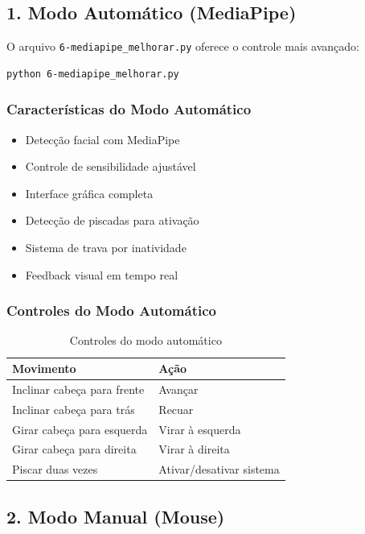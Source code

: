 \documentclass[12pt,a4paper]{article}
\begin{document}
\subsection{1. Modo Automático (MediaPipe)}

O arquivo \texttt{6-mediapipe\_melhorar.py} oferece o controle mais avançado:

\begin{lstlisting}[language=bash]
python 6-mediapipe_melhorar.py
\end{lstlisting}

\subsubsection{Características do Modo Automático}

\begin{itemize}
    \item Detecção facial com MediaPipe
    \item Controle de sensibilidade ajustável
    \item Interface gráfica completa
    \item Detecção de piscadas para ativação
    \item Sistema de trava por inatividade
    \item Feedback visual em tempo real
\end{itemize}

\subsubsection{Controles do Modo Automático}

\begin{table}[H]
\centering
\begin{tabular}{|l|l|}
\hline
\textbf{Movimento} & \textbf{Ação} \\
\hline
Inclinar cabeça para frente & Avançar \\
Inclinar cabeça para trás & Recuar \\
Girar cabeça para esquerda & Virar à esquerda \\
Girar cabeça para direita & Virar à direita \\
Piscar duas vezes & Ativar/desativar sistema \\
\hline
\end{tabular}
\caption{Controles do modo automático}
\end{table}

\subsection{2. Modo Manual (Mouse)}
\end{document}
